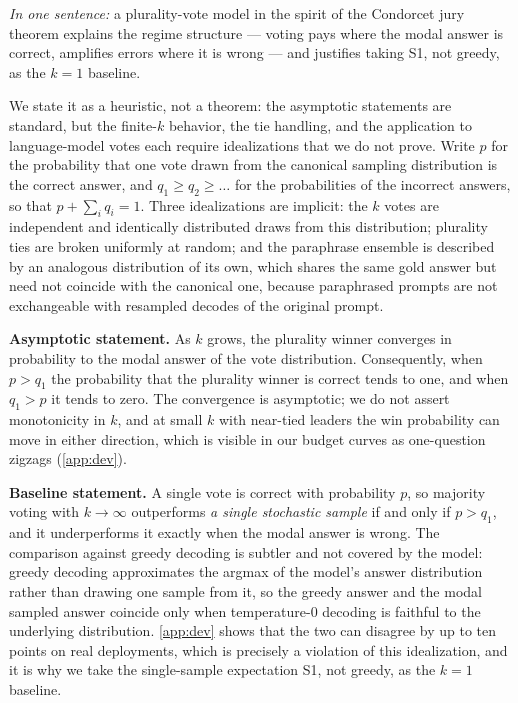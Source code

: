 \emph{In one sentence:} a plurality-vote model in the spirit of the Condorcet jury theorem \citep{condorcet1785essai} explains the regime structure --- voting pays where the modal answer is correct, amplifies errors where it is wrong --- and justifies taking S1, not greedy, as the $k{=}1$ baseline.

We state it as a heuristic, not a theorem: the asymptotic statements are standard, but the finite-$k$ behavior, the tie handling, and the application to language-model votes each require idealizations that we do not prove. Write $p$ for the probability that one vote drawn from the canonical sampling distribution is the correct answer, and $q_1 \ge q_2 \ge \dots$ for the probabilities of the incorrect answers, so that $p + \sum_i q_i = 1$. Three idealizations are implicit: the $k$ votes are independent and identically distributed draws from this distribution; plurality ties are broken uniformly at random; and the paraphrase ensemble is described by an analogous distribution of its own, which shares the same gold answer but need not coincide with the canonical one, because paraphrased prompts are not exchangeable with resampled decodes of the original prompt.

\textbf{Asymptotic statement.} As $k$ grows, the plurality winner converges in probability to the modal answer of the vote distribution. Consequently, when $p > q_1$ the probability that the plurality winner is correct tends to one, and when $q_1 > p$ it tends to zero. The convergence is asymptotic; we do not assert monotonicity in $k$, and at small $k$ with near-tied leaders the win probability can move in either direction, which is visible in our budget curves as one-question zigzags (\ref{app:dev}).

\textbf{Baseline statement.} A single vote is correct with probability $p$, so majority voting with $k \to \infty$ outperforms \emph{a single stochastic sample} if and only if $p > q_1$, and it underperforms it exactly when the modal answer is wrong. The comparison against greedy decoding is subtler and not covered by the model: greedy decoding approximates the argmax of the model's answer distribution rather than drawing one sample from it, so the greedy answer and the modal sampled answer coincide only when temperature-$0$ decoding is faithful to the underlying distribution. \ref{app:dev} shows that the two can disagree by up to ten points on real deployments, which is precisely a violation of this idealization, and it is why we take the single-sample expectation S1, not greedy, as the $k{=}1$ baseline.

